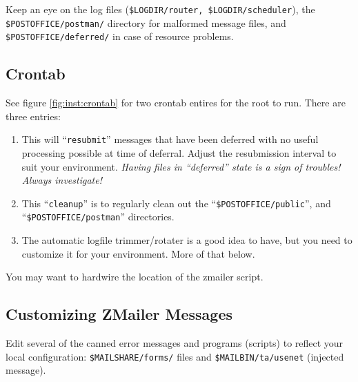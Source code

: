 Keep an eye on the log files ({\tt \$LOGDIR/router, \$LOGDIR/scheduler}),
the {\tt \$POSTOFFICE/postman/} directory for malformed message files,
and {\tt \$POSTOFFICE/deferred/} in case of resource problems.

\subsection{Crontab}


See figure \vref{fig:inst:crontab} for two crontab entires for
the root to run.  There are three entries:
\begin{enumerate}
\item
This will ``{\tt resubmit}'' messages that have been deferred with
no useful processing possible at time of deferral.  Adjust the
resubmission interval to suit your environment.
{\em Having files in ``deferred'' state is a sign of troubles!
Always investigate!}

\item
This ``{\tt cleanup}'' is to regularly clean out
the ``{\tt \$POSTOFFICE/public}'', and ``{\tt \$POSTOFFICE/postman}''
directories.

\item
The automatic logfile trimmer/rotater is a good idea to have, but
you need to customize it for your environment.  More of that below.
\end{enumerate}

You may want to hardwire the location of the zmailer script.


\subsection{Customizing ZMailer Messages}

Edit several of the canned error messages and programs (scripts)
to reflect your local configuration: {\tt \$MAILSHARE/forms/} files and
{\tt \$MAILBIN/ta/usenet} (injected message).

